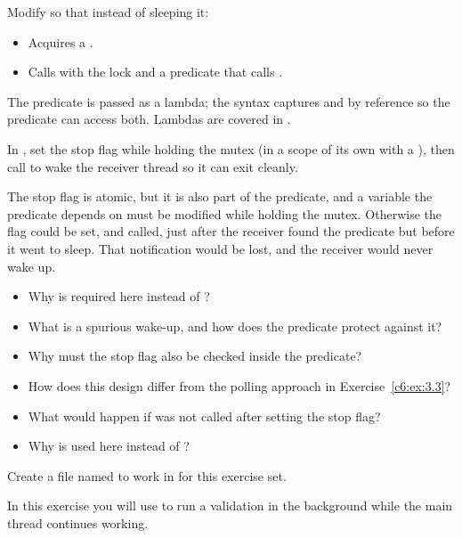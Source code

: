 Modify  so that instead of sleeping it:
\begin{itemize}
  \item Acquires a .
  \item Calls  with the lock and a predicate that calls .
\end{itemize}
\note The predicate is passed as a lambda; the \code{[&]} syntax captures  and
 by reference so the predicate can access both. Lambdas are covered in
.

In , set the stop flag while holding the mutex (in a scope of its own with a
), then call  to wake the receiver thread
so it can exit cleanly.

\note The stop flag is atomic, but it is also part of the predicate, and a variable the predicate
depends on must be modified while holding the mutex. Otherwise the flag could be set, and
 called, just after the receiver found the predicate  but before it
went to sleep. That notification would be lost, and the receiver would never wake up.

\begin{itemize}
  \item Why is  required here instead of ?
  \item What is a spurious wake-up, and how does the predicate protect against it?
  \item Why must the stop flag also be checked inside the predicate?
  \item How does this design differ from the polling approach in Exercise~\ref{c6:ex:3.3}?
  \item What would happen if  was not called after setting the stop flag?
  \item Why is  used here instead of ?
\end{itemize}

\label{c6:set:7}
Create a file named  to work in for this exercise set.

\label{c6:ex:7.1}
In this exercise you will use  to run a validation in the background while the
main thread continues working.

